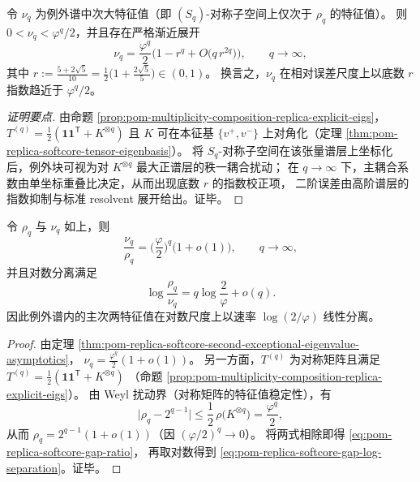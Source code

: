\begin{theorem}\label{thm:pom-replica-softcore-second-exceptional-eigenvalue-asymptotics}
令 \(\nu_q\) 为例外谱中次大特征值（即 \((S_q)\)-对称子空间上仅次于 \(\rho_q\) 的特征值）。
则 \(0<\nu_q<\varphi^q/2\)，并且存在严格渐近展开
\begin{equation}\label{eq:pom-replica-softcore-nuq-asymptotics}
\nu_q
=\frac{\varphi^{q}}{2}\Bigg(1-r^{q}
+O\!\bigl(q\,r^{2q}\bigr)\Bigg),
\qquad q\to\infty,
\end{equation}
其中
\(
r:=\frac{5+2\sqrt5}{10}
=\frac12\bigl(1+\frac{2\sqrt5}{5}\bigr)\in(0,1)
\)。
换言之，\(\nu_q\) 在相对误差尺度上以底数 \(r\) 指数趋近于 \(\varphi^q/2\)。
\end{theorem}
\begin{proof}[证明要点]
由命题 \ref{prop:pom-multiplicity-composition-replica-explicit-eigs}，
\(
T^{(q)}=\frac12(\mathbf{1}\mathbf{1}^{\mathsf T}+K^{\otimes q})
\)
且 \(K\) 可在本征基 \(\{v^+,v^-\}\) 上对角化（定理 \ref{thm:pom-replica-softcore-tensor-eigenbasis}）。
将 \(S_q\)-对称子空间在该张量谱层上坐标化后，例外块可视为对 \(K^{\otimes q}\) 最大正谱层的秩一耦合扰动；
在 \(q\to\infty\) 下，主耦合系数由单坐标重叠比决定，从而出现底数 \(r\) 的指数校正项，
二阶误差由高阶谱层的指数抑制与标准 resolvent 展开给出。证毕。
\end{proof}

\begin{theorem}[谱隙比率的指数律与对数分离速率]\label{thm:pom-replica-softcore-gap-ratio-log-separation}
令 \(\rho_q\) 与 \(\nu_q\) 如上，则
\begin{equation}\label{eq:pom-replica-softcore-gap-ratio}
\frac{\nu_q}{\rho_q}
=\Big(\frac{\varphi}{2}\Big)^{q}\Big(1+o(1)\Big),
\qquad q\to\infty,
\end{equation}
并且对数分离满足
\begin{equation}\label{eq:pom-replica-softcore-gap-log-separation}
\log\frac{\rho_q}{\nu_q}
= q\log\frac{2}{\varphi}+o(q).
\end{equation}
因此例外谱内的主次两特征值在对数尺度上以速率 \(\log(2/\varphi)\) 线性分离。
\end{theorem}
\begin{proof}
由定理 \ref{thm:pom-replica-softcore-second-exceptional-eigenvalue-asymptotics}，
\(
\nu_q=\frac{\varphi^q}{2}(1+o(1))
\)。
另一方面，\(T^{(q)}\) 为对称矩阵且满足
\(
T^{(q)}=\frac12(\mathbf{1}\mathbf{1}^{\mathsf T}+K^{\otimes q})
\)
（命题 \ref{prop:pom-multiplicity-composition-replica-explicit-eigs}）。
由 Weyl 扰动界（对称矩阵的特征值稳定性），有
\[
\bigl|\rho_q-2^{q-1}\bigr|
\le \frac12\,\rho\!\bigl(K^{\otimes q}\bigr)
=\frac{\varphi^q}{2},
\]
从而 \(\rho_q=2^{q-1}(1+o(1))\)（因 \((\varphi/2)^q\to 0\)）。
将两式相除即得 \eqref{eq:pom-replica-softcore-gap-ratio}，
再取对数得到 \eqref{eq:pom-replica-softcore-gap-log-separation}。证毕。
\end{proof}


